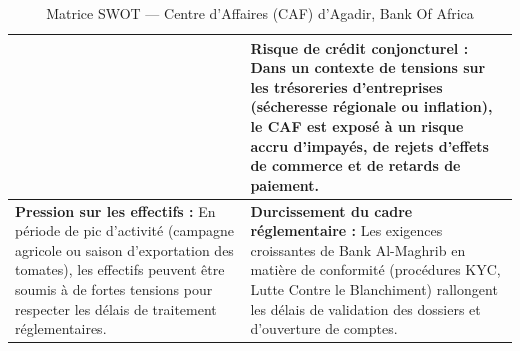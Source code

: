 \documentclass[12pt,a4paper]{report}
\begin{document}
\begin{table}[h!]
\begin{tabularx}{\textwidth}{|X|X|}
&
\textbf{Risque de crédit conjoncturel :} Dans un contexte de tensions sur les trésoreries d'entreprises (sécheresse régionale ou inflation), le CAF est exposé à un risque accru d'impayés, de rejets d'effets de commerce et de retards de paiement. \\
\hline
\textbf{Pression sur les effectifs :} En période de pic d'activité (campagne agricole ou saison d'exportation des tomates), les effectifs peuvent être soumis à de fortes tensions pour respecter les délais de traitement réglementaires.
&
\textbf{Durcissement du cadre réglementaire :} Les exigences croissantes de Bank Al-Maghrib en matière de conformité (procédures KYC, Lutte Contre le Blanchiment) rallongent les délais de validation des dossiers et d'ouverture de comptes. \\
\hline
\end{tabularx}
\caption{Matrice SWOT --- Centre d'Affaires (CAF) d'Agadir, Bank Of Africa}
\end{table}
\end{document}

